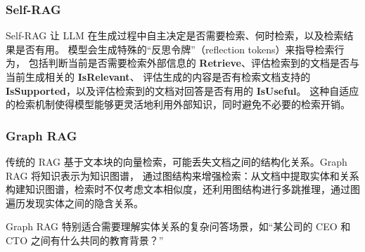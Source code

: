 \subsubsection{Self-RAG}
Self-RAG 让 LLM 在生成过程中自主决定是否需要检索、何时检索，以及检索结果是否有用。
模型会生成特殊的“反思令牌”（reflection tokens）来指导检索行为，
包括判断当前是否需要检索外部信息的 \textbf{Retrieve}、评估检索到的文档是否与当前生成相关的 \textbf{IsRelevant}、
评估生成的内容是否有检索文档支持的 \textbf{IsSupported}，以及评估检索到的文档对回答是否有用的 \textbf{IsUseful}。
这种自适应的检索机制使得模型能够更灵活地利用外部知识，同时避免不必要的检索开销。

\subsubsection{Graph RAG}
传统的 RAG 基于文本块的向量检索，可能丢失文档之间的结构化关系。Graph RAG 将知识表示为知识图谱，
通过图结构来增强检索：从文档中提取实体和关系构建知识图谱，检索时不仅考虑文本相似度，还利用图结构进行多跳推理，通过图遍历发现实体之间的隐含关系。

Graph RAG 特别适合需要理解实体关系的复杂问答场景，如“某公司的 CEO 和 CTO 之间有什么共同的教育背景？”

